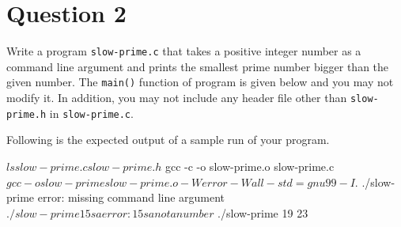 
\section*{Question 2}

Write a program \texttt{slow-prime.c} that takes a positive integer number as a command line argument and prints the smallest prime number bigger than the given number.
The \texttt{main()} function of program is given below and you may not modify it.
In addition, you may not include any header file other than \texttt{slow-prime.h} in \texttt{slow-prime.c}.

\lstset{language=c,tabsize=4}


Following is the expected output of a sample run of your program.

\begin{terminal}
$ ls
slow-prime.c slow-prime.h
$ gcc -c -o slow-prime.o slow-prime.c
$ gcc -o slow-prime slow-prime.o -Werror -Wall -std=gnu99 -I.
$ ./slow-prime
error: missing command line argument
$ ./slow-prime 15sa
error: 15sa not a number
$ ./slow-prime 19
23
\end{terminal}
